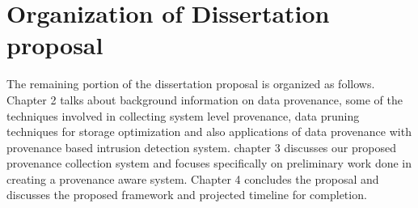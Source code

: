 \section{Organization of Dissertation proposal}

The remaining portion of the dissertation proposal is organized as follows.  Chapter 2 talks about background information on data provenance, some of the techniques involved in collecting system level provenance, data pruning techniques for storage optimization and also applications of data provenance with provenance based intrusion detection system. chapter 3 discusses our proposed provenance collection system and focuses specifically on preliminary work done in creating a provenance aware system. Chapter 4 concludes the proposal and discusses the proposed framework and projected timeline for completion.

